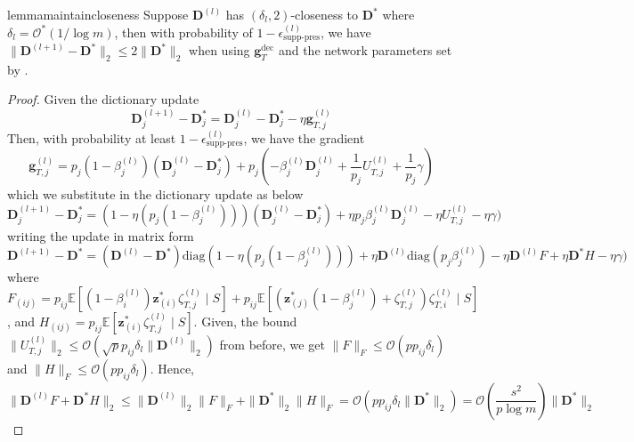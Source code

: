 \documentclass[10pt]{article} %
\newcommand{\E}{\mathbb{E}} %
\newcommand{\D}{{\bm D}}
\newcommand{\z}{{\bm z}}
\newcommand{\g}{{\bm g}}
\begin{document}
%
% 
\begin{restatable}{lemma}{maintaincloseness}\label{lemma:maintaincloseness}
Suppose $\D^{(l)}$ has $(\delta_l, 2)$-closeness to $\D^{\ast}$ where $\delta_l = \mathcal{O}^{\ast}(1/\log{m})$, then with probability of $1 - \epsilon_{\text{supp-pres}}^{(l)}$, we have $\| \D^{(l+1)} - \D^{\ast} \|_2 \leq 2 \| \D^{\ast} \|_2$ when using $\g_{T}^{\text{dec}}$ and the network parameters set by .
\end{restatable}
%
\begin{proof}
Given the dictionary update
\begin{equation}
    \D_j^{(l+1)} - \D_j^{\ast} =  \D_j^{(l)} - \D_j^{\ast} - \eta \g_{T,j}^{(l)} 
\end{equation}
Then, with probability at least $1 - \epsilon_{\text{supp-pres}}^{(l)}$, we have the gradient
\begin{equation}
    \g_{T, j}^{(l)} = p_j (1 - \beta_j^{(l)}) (\D_j^{(l)}
    - \D_j^{\ast}) + p_j (- \beta_j^{(l)} \D_j^{(l)} + \frac{1}{p_j} U_{T, j}^{(l)} + \frac{1}{p_j}\gamma)
\end{equation}
which we substitute in the dictionary update as below
\begin{equation}
    \D_j^{(l+1)} - \D_j^{\ast} =  (1 - \eta (p_j (1 - \beta_j^{(l)}))) (\D_j^{(l)} - \D_j^{\ast}) + \eta p_j \beta_j^{(l)} \D_j^{(l)} - \eta U_{T, j}^{(l)} - \eta \gamma)
\end{equation}
writing the update in matrix form
\begin{equation}
    \D^{(l+1)} - \D^{\ast} = (\D^{(l)} - \D^{\ast}) \text{diag}(1 - \eta (p_j (1 - \beta_j^{(l)}))) + \eta  \D^{(l)} \text{diag}(p_j \beta_j^{(l)}) - \eta \D^{(l)} F + \eta \D^{\ast} H - \eta \gamma)
\end{equation}
where $F_{(ij)} = p_{ij} \E[(1 - \beta_i^{(l)}) \z_{(i)}^{\ast} \zeta_{T,j}^{(l)} \mid S] + p_{ij} \E[( \z^{\ast}_{(j)} (1 - \beta_j^{(l)}) + \zeta_{T,j}^{(l)}) \zeta_{T,i}^{(l)} \mid S]$, and  $H_{(ij)} = p_{ij} \E[\z_{(i)}^{\ast} \zeta_{T,j}^{(l)} \mid S]$. Given, the bound $\| U_{T,j}^{(l)} \|_2 \leq \mathcal{O}(\sqrt{p} p_{ij} \delta_l \| \D^{(l)}\|_2)$ from before, we get $\| F \|_F \leq \mathcal{O}(p p_{ij} \delta_l)$ and $\| H \|_F \leq \mathcal{O}(p p_{ij} \delta_l)$. Hence,
\begin{equation}
\| \D^{(l)} F + \D^{\ast} H \|_2 \leq \|\D^{(l)} \|_2 \| F \|_F + \| \D^{\ast} \|_2 \| H \|_F = \mathcal{O}(p p_{ij} \delta_l \| \D^{\ast} \|_2) = \mathcal{O}(\frac{s^2}{p \log{m}}) \| \D^{\ast} \|_2

\end{equation}
\end{proof}
\end{document}
